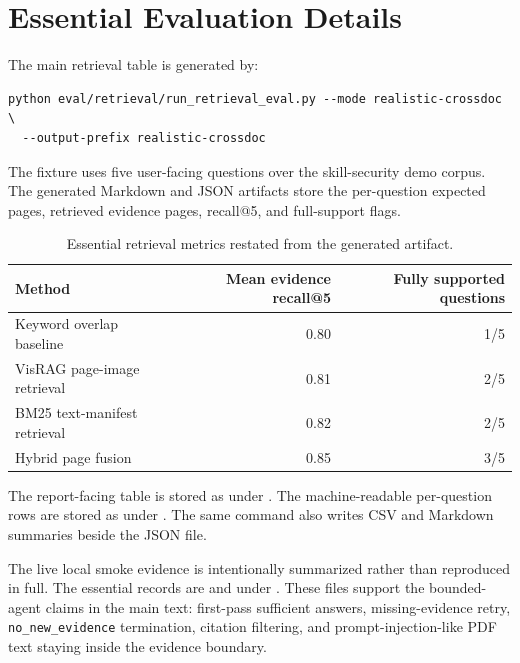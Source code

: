 \section{Essential Evaluation Details}
\label{app:full-metrics}

The main retrieval table is generated by:
\begin{verbatim}
python eval/retrieval/run_retrieval_eval.py --mode realistic-crossdoc \
  --output-prefix realistic-crossdoc
\end{verbatim}
The fixture uses five user-facing questions over the skill-security demo corpus. The generated Markdown and JSON artifacts store the per-question expected pages, retrieved evidence pages, recall@5, and full-support flags.

\begin{table}[h]
  \caption{Essential retrieval metrics restated from the generated artifact.}
  \label{tab:appendix-retrieval}
  \centering
  \small
  \setlength{\tabcolsep}{4pt}
  \begin{tabularx}{\linewidth}{Yrr}
    \toprule
    Method & Mean evidence recall@5 & Fully supported questions \\
    \midrule
    Keyword overlap baseline & 0.80 & 1/5 \\
    VisRAG page-image retrieval & 0.81 & 2/5 \\
    BM25 text-manifest retrieval & 0.82 & 2/5 \\
    Hybrid page fusion & 0.85 & 3/5 \\
    \bottomrule
  \end{tabularx}
\end{table}

The report-facing table is stored as  under . The machine-readable per-question rows are stored as  under . The same command also writes CSV and Markdown summaries beside the JSON file.

The live local smoke evidence is intentionally summarized rather than reproduced in full. The essential records are  and  under . These files support the bounded-agent claims in the main text: first-pass sufficient answers, missing-evidence retry, \texttt{no\_new\_evidence} termination, citation filtering, and prompt-injection-like PDF text staying inside the evidence boundary.
